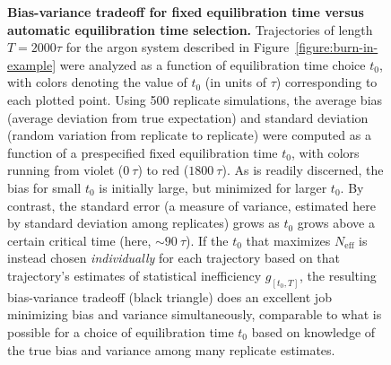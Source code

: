 \documentclass[aps,pre,twocolumn,nofootinbib,superscriptaddress,linenumbers,11point]{revtex4-1}
\begin{document}

\begin{figure}[tbp]
\caption{\label{figure:bias-variance} {\bf Bias-variance tradeoff for fixed equilibration time versus automatic equilibration time selection.} 
Trajectories of length $T = 2000 \tau$ for the argon system described in Figure~\ref{figure:burn-in-example} were analyzed as a function of equilibration time choice $t_0$, with colors denoting the value of $t_0$ (in units of $\tau$) corresponding to each plotted point.
Using 500 replicate simulations, the average bias (average deviation from true expectation) and standard deviation (random variation from replicate to replicate) were computed as a function of a prespecified fixed equilibration time $t_0$, with colors running from violet ($0~\tau$)  to red ($1800~\tau$).
As is readily discerned, the bias for small $t_0$ is initially large, but minimized for larger $t_0$.
By contrast, the standard error (a measure of variance, estimated here by standard deviation among replicates) grows as $t_0$ grows above a certain critical time (here, $\sim 90~\tau$).
If the $t_0$ that maximizes $N_\mathrm{eff}$ is instead chosen \emph{individually} for each trajectory based on that trajectory's estimates of statistical inefficiency $g_{[t_0,T]}$, the resulting bias-variance tradeoff (black triangle) does an excellent job minimizing bias and variance simultaneously, comparable to what is possible for a choice of equilibration time $t_0$ based on knowledge of the true bias and variance among many replicate estimates.
}
\end{figure}
\end{document}

